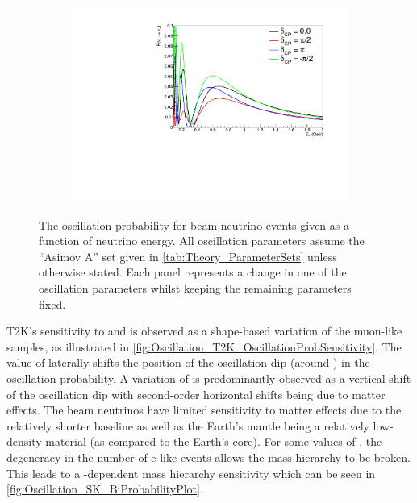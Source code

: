 \begin{figure}[h]
\begin{subfigure}[t]{0.5\textwidth}
    \includegraphics[width=\textwidth, trim={0mm 0mm 0mm 0mm}, clip,page=1]{Figures/Oscillation/T2K_NuMu_x_NuE_DCPSens.pdf}
  \end{subfigure}
  \caption{The oscillation probability for beam neutrino events given as a function of neutrino energy. All oscillation parameters assume the ``Asimov A'' set given in \autoref{tab:Theory_ParameterSets} unless otherwise stated. Each panel represents a change in one of the oscillation parameters whilst keeping the remaining parameters fixed.}
  \label{fig:Oscillation_T2K_OscillationProbSensitivity}
\end{figure}

T2K's sensitivity to  and  is observed as a shape-based variation of the muon-like samples, as illustrated in \autoref{fig:Oscillation_T2K_OscillationProbSensitivity}. The value of  laterally shifts the position of the oscillation dip (around ) in the  oscillation probability. A variation of  is predominantly observed as a vertical shift of the oscillation dip with second-order horizontal shifts being due to matter effects. The beam neutrinos have limited sensitivity to matter effects due to the relatively shorter baseline as well as the Earth's mantle being a relatively low-density material (as compared to the Earth's core). For some values of , the degeneracy in the number of e-like events allows the mass hierarchy to be broken. This leads to a -dependent mass hierarchy sensitivity which can be seen in \autoref{fig:Oscillation_SK_BiProbabilityPlot}.

